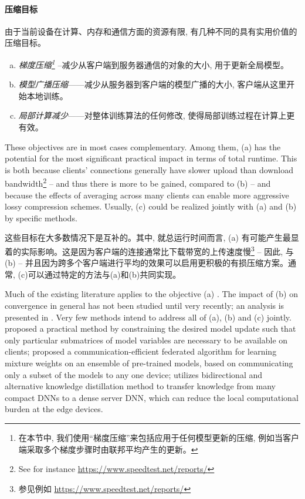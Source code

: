 \paragraph{压缩目标} 由于当前设备在计算、内存和通信方面的资源有限, 有几种不同的具有实用价值的压缩目标。
\begin{enumerate}[(a)]
    \item \emph{梯度压缩\footnote{在本节中, 我们使用“梯度压缩”来包括应用于任何模型更新的压缩, 例如当客户端采取多个梯度步骤时由联邦平均产生的更新。}} --减少从客户端到服务器通信的对象的大小, 用于更新全局模型。
    \item \emph{模型广播压缩}——减少从服务器到客户端的模型广播的大小, 客户端从这里开始本地训练。
    \item \emph{局部计算减少}——对整体训练算法的任何修改, 使得局部训练过程在计算上更有效。
\end{enumerate}

These objectives are in most cases complementary. Among them, (a) has the potential for the most significant practical impact in terms of total runtime. This is both because clients' connections generally have slower upload than download bandwidth\footnote{See for instance \url{https://www.speedtest.net/reports/}} -- and thus there is more to be gained, compared to (b) -- and because the effects of averaging across many clients can enable more aggressive lossy compression schemes. Usually, (c) could be realized jointly with (a) and (b) by specific methods. 

这些目标在大多数情况下是互补的。其中, 就总运行时间而言, (a) 有可能产生最显着的实际影响。这是因为客户端的连接通常比下载带宽的上传速度慢\footnote{参见例如 \url{https://www.speedtest.net/reports/}} -- 因此, 与(b) -- 并且因为跨多个客户端进行平均的效果可以启用更积极的有损压缩方案。通常, (c)可以通过特定的方法与(a)和(b)共同实现。



Much of the existing literature applies to the objective (a) \citep{konevcny2016federated, suresh2017distributed, konevcny2018randomized, alistarh2017qsgd, horvath2019natural, basu2020qsparse}. The impact of (b) on convergence in general has not been studied until very recently; an analysis is presented in \citep{chraibi2019distributed}. Very few methods intend to address all of (a), (b) and (c) jointly. \citet{caldas2018expanding} proposed a practical method by constraining the desired model update such that only particular submatrices of model variables are necessary to be available on clients; \citet{hamer2020fedboost} proposed a communication-efficient federated algorithm for learning mixture weights on an ensemble of pre-trained models, based on communicating only a subset of the models to any one device; \citet{FedGKT2020} utilizes bidirectional and alternative knowledge distillation method to transfer knowledge from many compact DNNs to a dense server DNN, which can reduce the local computational burden at the edge devices.

